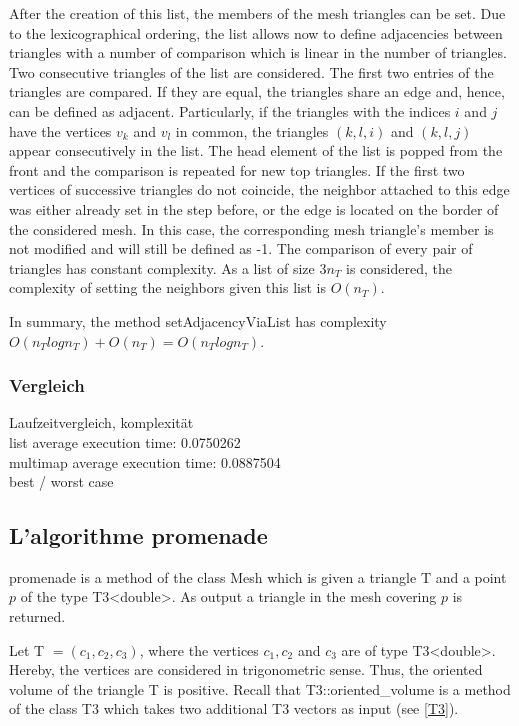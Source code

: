 \documentclass[10pt]{article}
\begin{document}
After the creation of this list, the members of the mesh triangles can be set. Due to the lexicographical ordering, the list allows now to define adjacencies between triangles with a number of comparison which is linear in the number of triangles. Two consecutive triangles of the list are considered. The first two entries of the triangles are compared. If they are equal, the triangles share an edge and, hence, can be defined as adjacent. Particularly, if the triangles with the indices $i$ and $j$ have the vertices $v_k$ and $v_l$ in common, the triangles $({k},{l},i)$ and $({k},{l},j)$ appear consecutively in the list. The head element of the list is popped from the front and the comparison is repeated for new top triangles. If the first two vertices of successive triangles do not coincide, the neighbor attached to this edge was either already set in the step before, or the edge is located on the border of the considered mesh. In this case, the corresponding mesh triangle's member is not modified and will still be defined as -1. The comparison of every pair of triangles has constant complexity. As a list of size $3 n_T$ is considered, the complexity of setting the neighbors given this list is $O(n_T)$.

In summary, the method {\ttfamily setAdjacencyViaList} has complexity $O(n_Tlogn_T) + O(n_T) = O(n_Tlogn_T)$.

\subsubsection{Vergleich}

Laufzeitvergleich, komplexität\\

list average execution time: 0.0750262\\
multimap average execution time: 0.0887504\\

best / worst case


\subsection{L'algorithme promenade} \label{promenade}

{\ttfamily promenade} is a method of the class Mesh which is given a triangle {\ttfamily T} and a point $p$ of the type {\ttfamily T3<double>}. As output a triangle in the mesh covering $p$ is returned. 

Let {\ttfamily T }$ = (c_1,c_2,c_3)$, where the vertices $c_1,c_2$ and $c_3$ are of type {\ttfamily T3<double>}. Hereby, the vertices are considered in trigonometric sense. Thus, the oriented volume of the triangle {\ttfamily T} is positive. Recall that {\ttfamily T3::oriented\_volume} is a method of the class {\ttfamily T3} which takes two additional {\ttfamily T3} vectors as input (see \ref{T3}).
\end{document}
